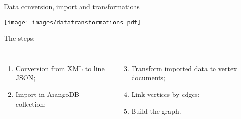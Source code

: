 \documentclass[aspectratio = 169, 15pt, trans]{beamer}
\begin{document}
    \begin{frame}{Data conversion, import and transformations}
        \begin{center}
            \vspace*{-0.1cm}
            \texttt{[image: images/datatransformations.pdf]}
        \end{center}
        
        \vspace*{-0.3cm}
        {\color{darkgray}The steps:}
        \begin{columns}[t]
                \vspace*{-0.3cm}
                \begin{enumerate}
                	\item \small Conversion from XML to line JSON;
                	\item \small Import in ArangoDB collection;
                \end{enumerate}
                
                \vspace*{-1.3cm}
                \begin{enumerate}
                    \setcounter{enumi}{2}
                	\item \small Transform imported data to vertex documents;
                	\item \small Link vertices by edges;
                	\item \small Build the graph.
                \end{enumerate}
        \end{columns}
    \end{frame}
    
\end{document}
